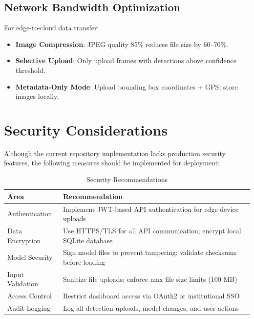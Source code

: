 \documentclass[12pt]{article}
\begin{document}
\subsection{Network Bandwidth Optimization}

For edge-to-cloud data transfer:

\begin{itemize}
    \item \textbf{Image Compression}: JPEG quality 85\% reduces file size by 60--70\%.
    \item \textbf{Selective Upload}: Only upload frames with detections above confidence threshold.
    \item \textbf{Metadata-Only Mode}: Upload bounding box coordinates + GPS, store images locally.
\end{itemize}

\section{Security Considerations}

Although the current repository implementation lacks production security features, the following measures should be implemented for deployment:

\begin{table}[H]
    \centering
    \caption{Security Recommendations}
    \label{tab:security}
    \begin{tabular}{p{}p{}}
        \toprule
        \textbf{Area} & \textbf{Recommendation} \\
        \midrule
        Authentication & Implement JWT-based API authentication for edge device uploads \\
        Data Encryption & Use HTTPS/TLS for all API communication; encrypt local SQLite database \\
        Model Security & Sign model files to prevent tampering; validate checksums before loading \\
        Input Validation & Sanitize file uploads; enforce max file size limits (100 MB) \\
        Access Control & Restrict dashboard access via OAuth2 or institutional SSO \\
        Audit Logging & Log all detection uploads, model changes, and user actions \\
        \bottomrule
    \end{tabular}
\end{table}
\end{document}
